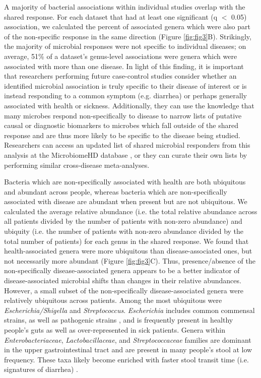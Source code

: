 A majority of bacterial associations within individual studies overlap with the shared response.
For each dataset that had at least one significant (q $<$ 0.05) association, we calculated the percent of associated genera which were also part of the non-specific response in the same direction (Figure \ref{fig:fig3}B).
Strikingly, the majority of microbial responses were not specific to individual diseases; on average, 51\% of a dataset's genus-level associations were genera which were associated with more than one disease.
In light of this finding, it is important that researchers performing future case-control studies consider whether an identified microbial association is truly specific to their disease of interest or is instead responding to a common symptom (e.g. diarrhea) or perhaps generally associated with health or sickness.
Additionally, they can use the knowledge that many microbes respond non-specifically to disease to narrow lists of putative causal or diagnostic biomarkers to microbes which fall outside of the shared response and are thus more likely to be specific to the disease being studied.
Researchers can access an updated list of shared microbial responders from this analysis at the MicrobiomeHD database \cite{microbiomehd}, or they can curate their own lists by performing similar cross-disease meta-analyses.

Bacteria which are non-specifically associated with health are both ubiquitous and abundant across people, whereas bacteria which are non-specifically associated with disease are abundant when present but are not ubiquitous.
We calculated the average relative abundance (i.e. the total relative abundance across all patients divided by the number of patients with non-zero abundance) and ubiquity (i.e. the number of patients with non-zero abundance divided by the total number of patients) for each genus in the shared response.
We found that health-associated genera were more ubiquitous than disease-associated ones, but not necessarily more abundant (Figure \ref{fig:fig3}C).
Thus, presence/absence of the non-specifically disease-associated genera appears to be a better indicator of disease-associated microbial shifts than changes in their relative abundances.
However, a small subset of the non-specifically disease-associated genera were relatively ubiquitous across patients.
Among the most ubiquitous were \textit{Escherichia/Shigella} and \textit{Streptococcus}.
\textit{Escherichia} includes common commensal strains, as well as pathogenic strains \cite{rasko2008pangenome}, and is frequently present in healthy people's guts as well as over-represented in sick patients. Genera within \textit{Enterobacteriaceae}, \textit{Lactobacillaceae}, and \textit{Streptococcaceae} families are dominant in the upper gastrointestinal tract \cite{donaldson2016gut,wang2013upper} and are present in many people's stool at low frequency. These taxa likely become enriched with faster stool transit time (i.e. signatures of diarrhea) \cite{donaldson2016gut,savage1977microbial}.


